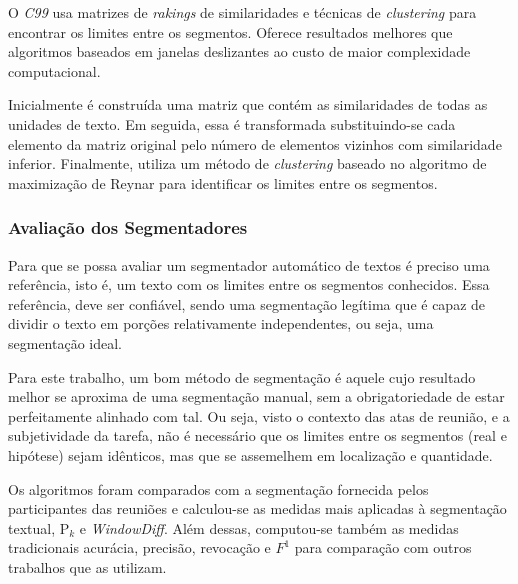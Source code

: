 O \textit{C99} usa matrizes de \textit{rakings} de similaridades e técnicas de \textit{clustering} para encontrar os limites entre os segmentos. Oferece resultados melhores que algoritmos baseados em janelas deslizantes ao custo de maior complexidade computacional.

Inicialmente é construída uma matriz que contém as similaridades de todas as unidades de texto. Em seguida, essa é transformada substituindo-se cada elemento da matriz original pelo número de elementos vizinhos com similaridade inferior.  Finalmente, utiliza um método de \textit{clustering} baseado no algoritmo de maximização de Reynar %
para identificar os limites entre os segmentos. 










\subsubsection{Avaliação dos Segmentadores}



Para que se possa avaliar um segmentador automático de textos é preciso uma referência, isto é, um texto com os limites entre os segmentos conhecidos. Essa referência, deve ser confiável, sendo uma segmentação legítima que é capaz de dividir o texto em porções relativamente independentes, ou seja, uma segmentação ideal.

Para este trabalho, um bom método de segmentação é aquele cujo resultado melhor se aproxima de uma segmentação manual, sem a obrigatoriedade de estar perfeitamente alinhado com tal. Ou seja, visto o contexto das atas de reunião, e a subjetividade da tarefa, não é necessário que os limites entre os segmentos (real e hipótese) sejam idênticos, mas que se assemelhem em localização e quantidade.

Os algoritmos foram comparados com a segmentação fornecida pelos participantes das reuniões e calculou-se as medidas mais aplicadas à segmentação textual, P$_k$ e \textit{WindowDiff}. Além dessas, computou-se também as medidas tradicionais acurácia, precisão, revocação e $F^1$ para comparação com outros trabalhos que as utilizam.



